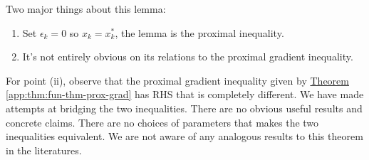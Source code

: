 \documentclass[12pt]{article}
\begin{document}
        \begin{remark}
            Two major things about this lemma: 
            \begin{enumerate}
                \item Set $\epsilon_k = 0$ so $x_k = x^*_k$, the lemma is the proximal inequality. 
                \item It's not entirely obvious on its relations to the proximal gradient inequality. 
            \end{enumerate}
            For point (ii), observe that the proximal gradient inequality given by 
            \hyperref[app:thm:fun-thm-prox-grad]{Theorem \ref*{app:thm:fun-thm-prox-grad}} 
            has RHS that is completely different. 
            We have made attempts at bridging the two inequalities. 
            There are no obvious useful results and concrete claims. 
            There are no choices of parameters that makes the two inequalities equivalent. 
            We are not aware of any analogous results to this theorem in the literatures. 

        \end{remark}
\end{document}
